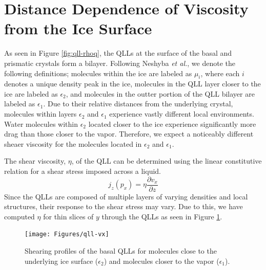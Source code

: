 \section{Distance Dependence of Viscosity from the Ice Surface}
As seen in Figure \ref{fig:qll-rhoq}, the QLLs at the surface of the
basal and prismatic crystals form a bilayer. Following Neshyba
\textit{et al.}, we denote the following definitions; molecules within
the ice are labeled as $\mu_{i}$, where each $i$ denotes a unique
density peak in the ice, molecules in the QLL layer closer to the ice
are labeled as $\epsilon_{2}$, and molecules in the outter portion of
the QLL bilayer are labeled as $\epsilon_{1}$.\cite{Neshyba2009} Due
to their relative distances from the underlying crystal, molecules
within layers $\epsilon_{2}$ and $\epsilon_{1}$ experience vastly
different local environments. Water molecules within $\epsilon_{2}$
located closer to the ice experience significantly more drag than
those closer to the vapor. Therefore, we expect a noticeably different
sheaer viscosity for the molecules located in $\epsilon_{2}$ and
$\epsilon_{1}$. 

The shear viscosity, $\eta$, of the QLL can be determined using the linear
constitutive relation for a shear stress imposed across a liquid.
\begin{equation}\label{eq:qll-visco}
j_z(p_x) = \eta \frac{\partial v_x}{\partial z}
\end{equation}
Since the QLLs are composed of multiple layers of varying densities
and local structures, their response to the shear stress may vary. Due
to this, we have computed $\eta$ for thin slices of $y$ through the
QLLs as seen in Figure \ref{fig:qll-vx}.

\begin{figure}
\texttt{[image: Figures/qll-vx]}
\caption{\label{fig:qll-vx} Shearing profiles of the basal QLLs for
  molecules close to the underlying ice surface ($\epsilon_{2}$) and
  molecules closer to the vapor ($\epsilon_{1}$). }
\end{figure}                


